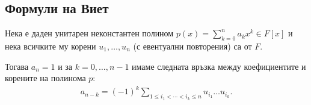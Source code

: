 \documentclass[numbers=endperiod, bibliography=totocnumbered]{scrartcl}
\begin{document}
\subsection{Формули на Виет}

\begin{theorem}
  Нека е даден унитарен неконстантен полином \( p(x) = \sum_{k=0}^n a_k x^k \in F[x] \) и нека всичките му корени \( u_1, \ldots, u_n \) (с евентуални повторения) са от \( F \).

  Тогава \( a_n = 1 \) и за \( k = 0, \ldots, n-1 \) имаме следната връзка между коефициентите и корените на полинома \( p \):
  \begin{align*}
    a_{n-k} = {(-1)}^k \sum_{1 \leq i_1 < \cdots < i_k \leq n} u_{i_1} \ldots u_{i_k}.
  \end{align*}
\end{theorem}
\end{document}

